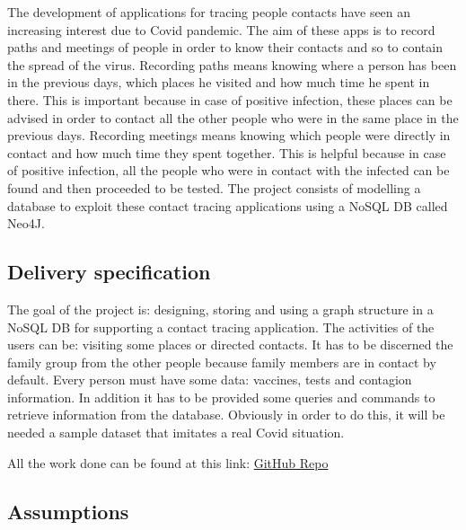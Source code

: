 \documentclass[table, 12pt]{article}
\begin{document}
The development of applications for tracing people contacts have seen an increasing interest due to Covid pandemic. The aim of these apps is to record paths and meetings of people in order to know their contacts and so to contain the spread of the virus. Recording paths means knowing where a person has been in the previous days, which places he visited and how much time he spent in there. This is important because in case of positive infection, these places can be advised in order to contact all the other people who were in the same place in the previous days. Recording meetings means knowing which people were directly in contact and how much time they spent together. This is helpful because in case of positive infection, all the people who were in contact with the infected can be found and then proceeded to be tested. The project consists of modelling a database to exploit these contact tracing applications using a NoSQL DB called Neo4J. 

\subsection{Delivery specification}
The goal of the project is: designing, storing and using a graph structure in a NoSQL DB for supporting a contact tracing application. The activities of the users can be: visiting some places or directed contacts. It has to be discerned the family group from the other people because family members are in contact by default. Every person must have some data: vaccines, tests and contagion information. In addition it has to be provided some queries and commands to retrieve information from the database. Obviously in order to do this, it will be needed a sample dataset that imitates a real Covid situation.

All the work done can be found at this link:
\href{https://github.com/pollomarzo/SAMBUD_proj}{GitHub Repo}

\subsection{Assumptions}
\end{document}
